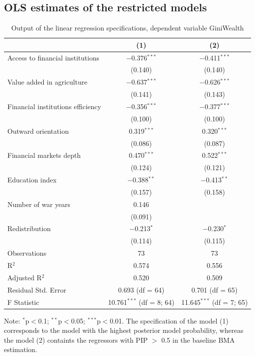 \documentclass[a4paper,11pt]{article}
\begin{document}
\subsection*{OLS estimates of the restricted models}
\begin{table}[!htbp] 
\centering 
\caption{Output of the linear regression specifications, dependent variable GiniWealth} 
\label{tab:ols}
\begin{threeparttable}
\begin{tabular}{@{\extracolsep{5pt}}lcc} 
\toprule
  & (1) & (2) \\ 
\midrule
 Access to financial institutions & $-$0.376$^{***}$ & $-$0.411$^{***}$ \\ 
  & (0.140) & (0.140) \\ 
 Value added in agriculture & $-$0.637$^{***}$ & $-$0.626$^{***}$ \\ 
  & (0.141) & (0.143) \\ 
 Financial institutions efficiency & $-$0.356$^{***}$ & $-$0.377$^{***}$ \\ 
  & (0.100) & (0.100) \\ 
 Outward orientation & 0.319$^{***}$ & 0.320$^{***}$ \\ 
  & (0.086) & (0.087) \\ 
 Financial markets depth & 0.470$^{***}$ & 0.522$^{***}$ \\ 
  & (0.124) & (0.121) \\ 
 Education index & $-$0.388$^{**}$ & $-$0.413$^{**}$ \\ 
  & (0.157) & (0.158) \\ 
 Number of war years & 0.146 &  \\ 
  & (0.091) &  \\ 
 Redistribution & $-$0.213$^{*}$ & $-$0.230$^{*}$ \\ 
  & (0.114) & (0.115) \\ 
\midrule 
Observations & 73 & 73 \\ 
R$^{2}$ & 0.574 & 0.556 \\ 
Adjusted R$^{2}$ & 0.520 & 0.509 \\ 
Residual Std. Error & 0.693 (df = 64) & 0.701 (df = 65) \\ 
F Statistic & 10.761$^{***}$ (df = 8; 64) & 11.645$^{***}$ (df = 7; 65) 
\end{tabular}
\begin{tablenotes}
\footnotesize
\item Note: {$^{*}$p$<$0.1; $^{**}$p$<$0.05; $^{***}$p$<$0.01.} The specification of the model (1) corresponds to the model with the highest posterior model probability, whereas the model (2) containts the regressors with \ac{PIP} $>$ 0.5 in the baseline \ac{BMA} estimation.
\end{tablenotes}
\end{threeparttable}
\end{table}
\clearpage
\end{document}
